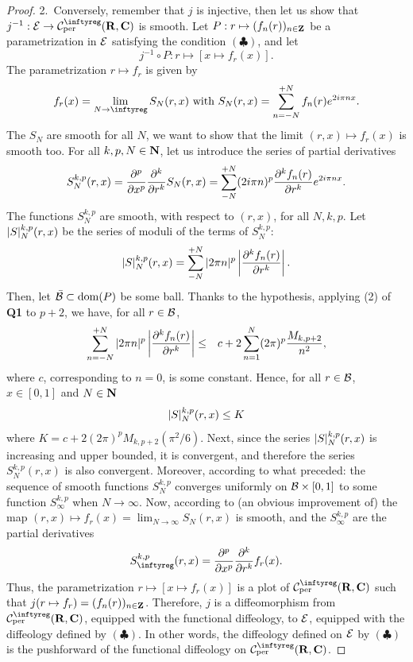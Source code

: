 \begin{proof}
  {2.}~Conversely, remember that $j$ is injective, then
  let us show that $j^{-1}: \cE \to \Cinfty_{\rm per}(\RR,\CC)$ is smooth.
  Let $P: r \mapsto (f_n(r))_{n\in\mathbf{Z}}$ be a parametrization in $\mathcal{E}$ satisfying the condition $(\clubsuit)$, and let
  $$
    j^{-1}\circ P : r \mapsto [x \mapsto f_r(x)].
    $$
  The parametrization $r \mapsto f_r$ is given by
  $$
    f_r(x) = \lim_{N \to \infty} S_N(r,x) \SpacedText{with} S_N(r,x) = \sum_{n=-N}^{+N} f_n(r)e^{2i\pi n x}.
    $$
  The $S_N$ are smooth for all $N$, we want to show that the limit $(r,x) \mapsto f_r(x)$ is smooth too.
  For all $k,p,N \in \mathbf{N}$, let us introduce the series
  of partial derivatives
  $$
    S_N^{k,p}(r,x) = {\partial^p \over \partial x^p}{\partial^k \over \partial r^k}S_N(r,x) =
    \sum_{-N}^{+N} (2i\pi n)^p {\partial^k f_n(r) \over \partial r^k} e^{2i\pi n x}.
    $$
  The functions $S_N^{k,p}$ are smooth, with respect to $(r,x)$,
  for all $N,k,p$.
  Let $\vert S \vert_N^{k,p}(r,x)$ be the series of moduli of the terms of $S_N^{k,p}$:
  $$
    \vert S \vert_N^{k,p}(r,x) = \sum_{-N}^{+N} \vert 2\pi n \vert^p \left|{\partial^k f_n(r) \over \partial r^k}\right|.
    $$
  Then, let $\bar{\mathcal{B}} \subset \mathrm{dom}(P)$ be some ball.
  Thanks to the hypothesis, applying (2) of {\bf Q1} to $p+2$, we have, for all $r\in \mathcal{B}$,
  \begin{eqnarray*}
    \sum_{n=-N}^{+N} \vert 2\pi n \vert^p \left| {\partial^k f_n(r) \over \partial r^k} \right| & \leq &
    c + 2\sum_{n=1}^N (2\pi)^p {M_{k,p+2} \over n^2},
  \end{eqnarray*}
  where $c$, corresponding to $n=0$, is some constant. Hence, for all $r\in\mathcal{B}$, $x\in[0,1]$ and $N\in\mathbf{N}$
  $$
    \vert S \vert_N^{k,p}(r,x) \leq K
    $$
  where $K= c + 2(2\pi)^p M_{k,p+2}(\pi^2/6)$. Next, since the series $\vert S \vert_N^{k,p}(r,x)$
  is increasing and upper bounded, it
  is convergent, and therefore the series $S_N^{k,p}(r,x)$ is also convergent. Moreover, according to what preceded:
  the sequence of smooth functions $S_N^{k,p}$
  converges uniformly on $\mathcal{B} \times [0,1]$ to some function $S_\infty^{k,p}$ when $N \to \infty$.
  Now, according to (an obvious improvement of) \cite[Thm. 3.10]{Don00} the map $(r,x) \mapsto f_r(x) = \lim_{N\to\infty}S_N(r,x)$ is smooth,
  and the $S_\infty^{k,p}$ are the partial derivatives
  $$
    S_\infty^{k,p}(r,x) = {\partial^p \over \partial x^p}{\partial^k \over \partial r^k}f_r(x).
    $$
  Thus, the parametrization $r \mapsto [x \mapsto f_r(x)]$ is a plot of $\Cinfty_{\rm per}(\RR,\CC)$
  such that $j(r\mapsto f_r) = (f_n(r))_{n\in\mathbf{Z}}$.
  Therefore, $j$ is a diffeomorphism from $\Cinfty_{\rm per}(\RR,\CC)$, equipped with the functional diffeology, to
  $\mathcal{E}$, equipped with the diffeology defined by $(\clubsuit)$. In other words, the diffeology defined on $\mathcal{E}$ by $(\clubsuit)$
  is the pushforward of the functional diffeology on $\Cinfty_{\rm per}(\RR,\CC)$.
\end{proof}
